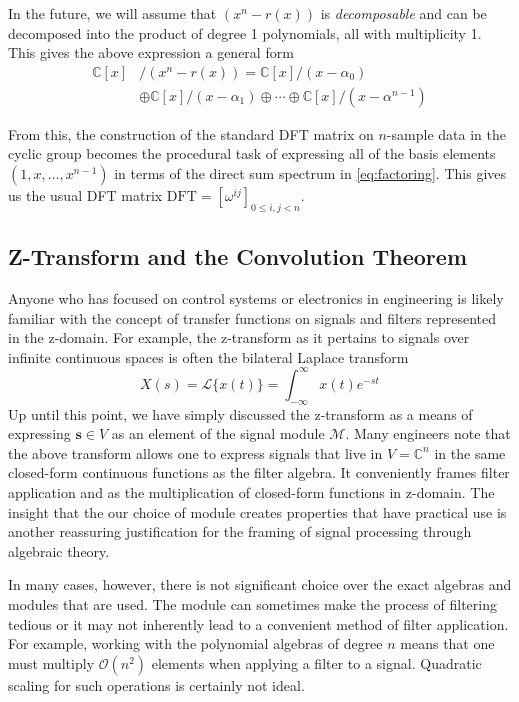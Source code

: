 \documentclass[12pt,technote]{IEEEtran}
\begin{document}
In the future, we will assume that $(x^n - r(x))$ is \textit{decomposable} and can be decomposed into the product of degree 1 polynomials, all with multiplicity 1. This gives the above expression a general form
\begin{align}
    \mathbb{C}[x]&/(x^n-r(x)) = \mathbb{C}[x]/(x-\alpha_0)\nonumber\\
    &\oplus\mathbb{C}[x]/(x-\alpha_1)\oplus\cdots \oplus\mathbb{C}[x]/(x-\alpha^{n-1})\label{eq:factoring}
\end{align}

From this, the construction of the standard DFT matrix on $n$-sample data in the cyclic group becomes the procedural task of expressing all of the basis elements $(1, x, \dots, x^{n-1})$ in terms of the direct sum spectrum in \eqref{eq:factoring}. This gives us the usual DFT matrix $\text{DFT} = [\omega^{ij}]_{0\leq i, j < n}$.
\subsection{Z-Transform and the Convolution Theorem}
Anyone who has focused on control systems or electronics in engineering is likely familiar with the concept of transfer functions on signals and filters represented in the z-domain. For example, the z-transform as it pertains to signals over infinite continuous spaces is often the bilateral Laplace transform
\begin{equation*}
    X(s) = \mathcal{L}\{x(t)\} = \int_{-\infty}^\infty x(t)e^{-st}
\end{equation*}
Up until this point, we have simply discussed the z-transform as a means of expressing $\mathbf{s}\in V$ as an element of the signal module $\mathcal{M}$. Many engineers note that the above transform allows one to express signals that live in $V = \mathbb{C}^n$ in the same closed-form continuous functions as the filter algebra. It conveniently frames filter application and as the multiplication of closed-form functions in z-domain. The insight that the our choice of module creates properties that have practical use is another reassuring justification for the framing of signal processing through algebraic theory.

In many cases, however, there is not significant choice over the exact algebras and modules that are used. The module can sometimes make the process of filtering tedious or it may not inherently lead to a convenient method of filter application. For example, working with the polynomial algebras of degree $n$ means that one must multiply $\mathcal{O}(n^2)$ elements when applying a filter to a signal. Quadratic scaling for such operations is certainly not ideal.
\end{document}

